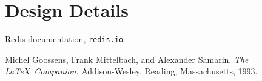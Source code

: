 \documentclass[11pt]{article}
\begin{document}
\pagebreak
\section*{Design Details}



\pagebreak
\begin{thebibliography}{9}

Redis documentation,
\texttt{redis.io}
        
Michel Goossens, Frank Mittelbach, and Alexander Samarin. 
\textit{The \LaTeX\ Companion}. 
Addison-Wesley, Reading, Massachusetts, 1993.
%  
%  
\end{thebibliography}
\end{document}

